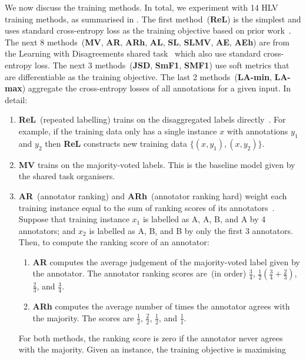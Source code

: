 \documentclass[shortpaper]{clv2025}
\newcommand{\methname}[1]{\textbf{#1}}  %
\begin{document}
We now discuss the training methods. In total,
we experiment with 14 HLV training methods, as summarised in
. The first method~(\methname{ReL}) is the simplest and
uses standard cross-entropy loss as the training objective based on prior
work~\citep{sheng2008}. The next 8
methods~(\methname{MV}, \methname{AR}, \methname{ARh}, \methname{AL},
\methname{SL}, \methname{SLMV}, \methname{AE}, \methname{AEh}) are from the
Learning with Disagreements shared task~\citep{leonardelli2023} which also use
standard cross-entropy loss. The next 3 methods~(\methname{JSD}, \methname{SmF1},
\methname{SMF1}) use soft metrics that are differentiable as the training
objective. The last 2 methods~(\methname{LA-min}, \methname{LA-max}) aggregate
the cross-entropy losses of all annotations for a given input. In detail:
\begin{enumerate}
  \item \methname{ReL}~(repeated labelling) trains on the disaggregated labels
    directly~\citep{sheng2008}. For example, if the training data only has a
    single instance $x$ with annotations $y_1$ and $y_2$ then \methname{ReL}
    constructs new training data $\{(x,y_1),(x,y_2)\}$.
  \item \methname{MV} trains on the majority-voted labels. This is the baseline
    model given by the shared task organisers.
  \item \methname{AR}~(annotator ranking) and \methname{ARh}~(annotator ranking
    hard) weight each training instance equal to the sum of ranking scores of
    its annotators~\citep{cui2023}. Suppose that training instance $x_1$ is
    labelled as A, A, B, and A by 4 annotators; and $x_2$ is labelled as A, B,
    and B by only the first 3 annotators. Then, to compute the ranking score of
    an annotator:
    \begin{enumerate}
      \item \methname{AR} computes the average judgement of the majority-voted
        label given by the annotator. The annotator ranking scores are~(in
        order) $\frac{3}{4}$, $\frac{1}{2}\left(\frac{3}{4}+\frac{2}{3}
        \right)$, $\frac{2}{3}$, and $\frac{3}{4}$.
      \item \methname{ARh} computes the average number of times the annotator
        agrees with the majority. The scores are $\frac{1}{2}$, $\frac{2}{2}$,
        $\frac{1}{2}$, and $\frac{1}{1}$.
    \end{enumerate}
    For both methods, the ranking score is zero if the annotator never agrees
    with the majority. Given an instance, the training objective is maximising

\end{enumerate}
\end{document}
